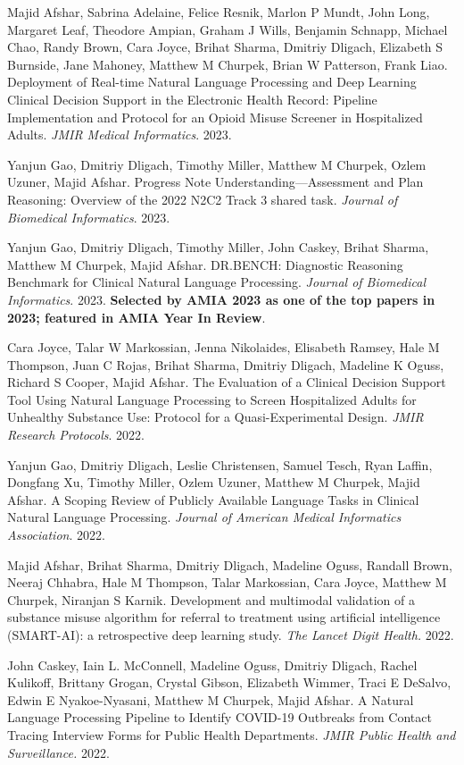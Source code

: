 \documentclass[letterpaper]{article}
\renewenvironment{itemize}{
  \begin{list}{}{
    \setlength{\leftmargin}{1.5em}
  }
}{
  \end{list}
}
\begin{document}
\begin{itemize}
\item Majid Afshar, Sabrina Adelaine, Felice Resnik, Marlon P Mundt, John Long, Margaret Leaf, Theodore Ampian, Graham J Wills, Benjamin Schnapp, Michael Chao, Randy Brown, Cara Joyce, Brihat Sharma, Dmitriy Dligach, Elizabeth S Burnside, Jane Mahoney, Matthew M Churpek, Brian W Patterson, Frank Liao. Deployment of Real-time Natural Language Processing and Deep Learning Clinical Decision Support in the Electronic Health Record: Pipeline Implementation and Protocol for an Opioid Misuse Screener in Hospitalized Adults. \emph{JMIR Medical Informatics}. 2023.
\item Yanjun Gao, Dmitriy Dligach, Timothy Miller, Matthew M Churpek, Ozlem Uzuner, Majid Afshar. Progress Note Understanding—Assessment and Plan Reasoning: Overview of the 2022 N2C2 Track 3 shared task. \emph{Journal of Biomedical Informatics}. 2023.
\item Yanjun Gao, Dmitriy Dligach, Timothy Miller, John Caskey, Brihat Sharma, Matthew M Churpek, Majid Afshar. DR.BENCH: Diagnostic Reasoning Benchmark for Clinical Natural Language Processing. \emph{Journal of Biomedical Informatics}. 2023. \textbf{Selected by AMIA 2023 as one of the top papers in 2023; featured in AMIA Year In Review}.
\item Cara Joyce, Talar W Markossian, Jenna Nikolaides, Elisabeth Ramsey, Hale M Thompson, Juan C Rojas, Brihat Sharma, Dmitriy Dligach, Madeline K Oguss, Richard S Cooper, Majid Afshar. The Evaluation of a Clinical Decision Support Tool Using Natural Language Processing to Screen Hospitalized Adults for Unhealthy Substance Use: Protocol for a Quasi-Experimental Design. \emph{JMIR Research Protocols}. 2022.
\item Yanjun Gao, Dmitriy Dligach, Leslie Christensen, Samuel Tesch, Ryan Laffin, Dongfang Xu, Timothy Miller, Ozlem Uzuner, Matthew M Churpek, Majid Afshar. A Scoping Review of Publicly Available Language Tasks in Clinical Natural Language Processing. \emph{Journal of American Medical Informatics Association}. 2022.
\item Majid Afshar, Brihat Sharma, Dmitriy Dligach, Madeline Oguss, Randall Brown, Neeraj Chhabra, Hale M Thompson, Talar Markossian, Cara Joyce, Matthew M Churpek, Niranjan S Karnik. Development and multimodal validation of a substance misuse algorithm for referral to treatment using artificial intelligence (SMART-AI): a retrospective deep learning study. \emph{The Lancet Digit Health.} 2022.
\item John Caskey, Iain L. McConnell, Madeline Oguss, Dmitriy Dligach, Rachel Kulikoff, Brittany Grogan, Crystal Gibson, Elizabeth Wimmer, Traci E DeSalvo, Edwin E Nyakoe-Nyasani, Matthew M Churpek, Majid Afshar. A Natural Language Processing Pipeline to Identify COVID-19 Outbreaks from Contact Tracing Interview Forms for Public Health Departments. \emph{JMIR Public Health and Surveillance.} 2022.

\end{itemize}
\end{document}

